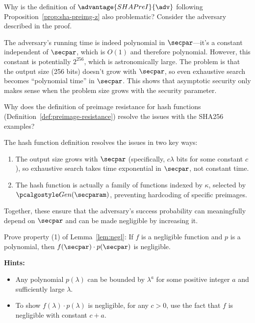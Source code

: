 \begin{exercise}\label{ex:sha-random-preimage-problem}
  Why is the definition of $\advantage{SHAPreI}{\adv}$ following Proposition~\ref{prop:sha-preimg-z} also problematic?
  Consider the adversary described in the proof.
\end{exercise}

\ifsolutions
\begin{mysolution}
  The adversary's running time is indeed polynomial in $\secpar$—it's a constant independent of $\secpar$, which is $O(1)$ and therefore polynomial.
  However, this constant is potentially $2^{256}$, which is astronomically large.
  The problem is that the output size (256 bits) doesn't grow with $\secpar$, so even exhaustive search becomes ``polynomial time'' in $\secpar$.
  This shows that asymptotic security only makes sense when the problem size grows with the security parameter.
\end{mysolution}
\fi

\begin{exercise}\label{ex:hash-function-definition}
  Why does the definition of preimage resistance for hash functions (Definition~\ref{def:preimage-resistance}) resolve the issues with the SHA256 examples?
\end{exercise}

\ifsolutions
\begin{mysolution}
  The hash function definition resolves the issues in two key ways:
  \begin{enumerate}
    \item The output size grows with $\secpar$ (specifically, $c\lambda$ bits for some constant $c$), so exhaustive search takes time exponential in $\secpar$, not constant time.
    \item The hash function is actually a family of functions indexed by $\kappa$, selected by $\algo{Gen}(\secparam)$, preventing hardcoding of specific preimages.
  \end{enumerate}
  Together, these ensure that the adversary's success probability can meaningfully depend on $\secpar$ and can be made negligible by increasing it.
\end{mysolution}
\fi

\begin{exercise}[Optional]\label{ex:negl-property-proof}
  Prove property (1) of Lemma~\ref{lem:negl}: If $f$ is a negligible function and $p$ is a polynomial, then $f(\secpar) \cdot p(\secpar)$ is negligible.
  
  \textbf{Hints:}
  \begin{itemize}
    \item Any polynomial $p(\lambda)$ can be bounded by $\lambda^{a}$ for some positive integer $a$ and sufficiently large $\lambda$.
    \item To show $f(\lambda) \cdot p(\lambda)$ is negligible, for any $c > 0$, use the fact that $f$ is negligible with constant $c + a$.
  \end{itemize}
\end{exercise}

